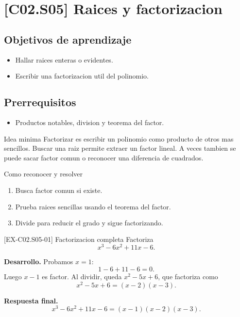\section{[C02.S05] Raices y factorizacion}

\subsection*{Objetivos de aprendizaje}
\begin{itemize}
  \item Hallar raices enteras o evidentes.
  \item Escribir una factorizacion util del polinomio.
\end{itemize}

\subsection*{Prerrequisitos}
\begin{itemize}
  \item Productos notables, division y teorema del factor.
\end{itemize}

\begin{theorybox}{Idea minima}
Factorizar es escribir un polinomio como producto de otros mas sencillos. Buscar una raiz
permite extraer un factor lineal. A veces tambien se puede sacar factor comun o reconocer una
diferencia de cuadrados.
\end{theorybox}

\begin{methodbox}{Como reconocer y resolver}
\begin{enumerate}
  \item Busca factor comun si existe.
  \item Prueba raices sencillas usando el teorema del factor.
  \item Divide para reducir el grado y sigue factorizando.
\end{enumerate}
\end{methodbox}

\begin{solvedexample}{[EX-C02.S05-01] Factorizacion completa}
Factoriza
\[
x^3-6x^2+11x-6.
\]

\textbf{Desarrollo.} Probamos \(x=1\):
\[
1-6+11-6=0.
\]
Luego \(x-1\) es factor. Al dividir, queda \(x^2-5x+6\), que factoriza como
\[
x^2-5x+6=(x-2)(x-3).
\]

\textbf{Respuesta final.}
\[
x^3-6x^2+11x-6=(x-1)(x-2)(x-3).
\]
\end{solvedexample}

